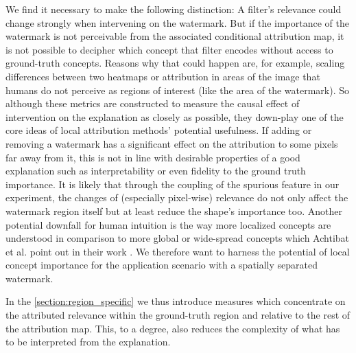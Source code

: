 We find it necessary to make the following distinction: A filter's relevance could change strongly when intervening on the watermark. But if the importance of the watermark is not perceivable from the associated conditional attribution map, it is not possible to decipher which concept that filter encodes without access to ground-truth concepts. Reasons why that could happen are, for example, scaling differences between two heatmaps or attribution in areas of the image that humans do not perceive as regions of interest (like the area of the watermark).
So although these metrics are constructed to measure the causal effect of intervention on the explanation as closely as possible, they down-play one of the core ideas of local attribution methods' potential usefulness. If adding or removing a watermark has a significant effect on the attribution to some pixels far away from it, this is not in line with desirable properties of a good explanation such as interpretability or even fidelity to the ground truth importance. It is likely that through the coupling of the spurious feature in our experiment, the changes of (especially pixel-wise) relevance do not only affect the watermark region itself but at least reduce the shape's importance too. 
Another potential downfall for human intuition is the way more localized concepts are understood in comparison to more global or wide-spread concepts which Achtibat et al. point out in their work \cite{Achtibat2022}. We therefore want to harness the potential of local concept importance for the application scenario with a spatially separated watermark.

In the \cref{section:region_specific} we thus introduce measures which concentrate on the attributed relevance within the ground-truth region and relative to the rest of the attribution map. This, to a degree, also reduces the complexity of what has to be interpreted from the explanation.
